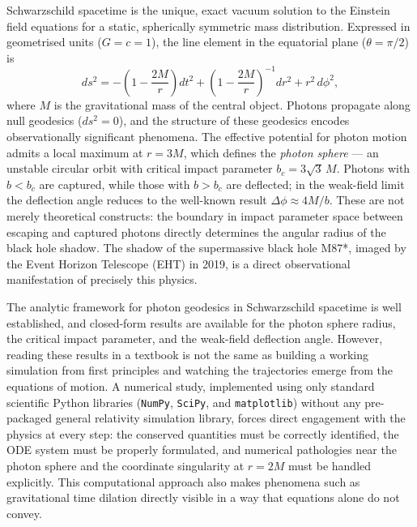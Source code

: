 \documentclass[12pt,a4paper]{article}
\begin{document}
Schwarzschild spacetime is the unique, exact vacuum solution to the Einstein field equations for a static, spherically symmetric mass distribution. Expressed in geometrised units ($G = c = 1$), the line element in the equatorial plane ($\theta = \pi/2$) is
\begin{equation*}
    ds^{2} = -\!\left(1 - \frac{2M}{r}\right)dt^{2}
             + \left(1 - \frac{2M}{r}\right)^{-1}dr^{2}
             + r^{2}\,d\phi^{2},
\end{equation*}
where $M$ is the gravitational mass of the central object. Photons propagate along null geodesics ($ds^{2} = 0$), and the structure of these geodesics encodes observationally significant phenomena. The effective potential for photon motion admits a local maximum at $r = 3M$, which defines the \emph{photon sphere} — an unstable circular orbit with critical impact parameter $b_{c} = 3\sqrt{3}\,M$. Photons with $b < b_{c}$ are captured, while those with $b > b_{c}$ are deflected; in the weak-field limit the deflection angle reduces to the well-known result $\Delta\phi \approx 4M/b$. These are not merely theoretical constructs: the boundary in impact parameter space between escaping and captured photons directly determines the angular radius of the black hole shadow. The shadow of the supermassive black hole M87*, imaged by the Event Horizon Telescope (EHT) in 2019, is a direct observational manifestation of precisely this physics.

The analytic framework for photon geodesics in Schwarzschild spacetime is well established, and closed-form results are available for the photon sphere radius, the critical impact parameter, and the weak-field deflection angle. However, reading these results in a textbook is not the same as building a working simulation from first principles and watching the trajectories emerge from the equations of motion. A numerical study, implemented using only standard scientific Python libraries (\texttt{NumPy}, \texttt{SciPy}, and \texttt{matplotlib}) without any pre-packaged general relativity simulation library, forces direct engagement with the physics at every step: the conserved quantities must be correctly identified, the ODE system must be properly formulated, and numerical pathologies near the photon sphere and the coordinate singularity at $r = 2M$ must be handled explicitly. This computational approach also makes phenomena such as gravitational time dilation directly visible in a way that equations alone do not convey.
\end{document}
